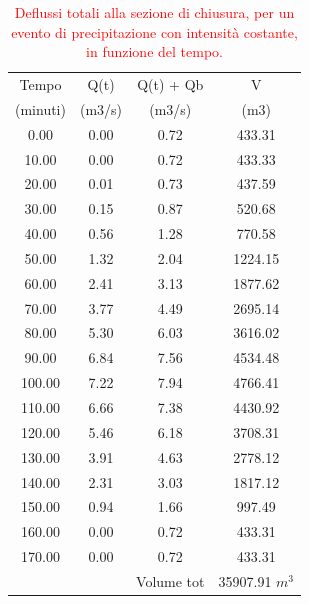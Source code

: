 \begin{table}[H] \centering
    \caption{\textcolor{red}{Deflussi totali alla sezione di chiusura, per un evento di precipitazione con intensità costante, in funzione del tempo.}}
    \begin{tabular}{cccc}
        \toprule
        Tempo    & Q(t)   & Q(t) + Qb           & V                 \\
        (minuti) & (m3/s) & (m3/s)              & (m3)              \\
        \midrule
        0.00     & 0.00   & 0.72                & 433.31            \\
        10.00    & 0.00   & 0.72                & 433.33            \\
        20.00    & 0.01   & 0.73                & 437.59            \\
        30.00    & 0.15   & 0.87                & 520.68            \\
        40.00    & 0.56   & 1.28                & 770.58            \\
        50.00    & 1.32   & 2.04                & 1224.15           \\
        60.00    & 2.41   & 3.13                & 1877.62           \\
        70.00    & 3.77   & 4.49                & 2695.14           \\
        80.00    & 5.30   & 6.03                & 3616.02           \\
        90.00    & 6.84   & 7.56                & 4534.48           \\
        100.00   & 7.22   & 7.94                & 4766.41           \\
        110.00   & 6.66   & 7.38                & 4430.92           \\
        120.00   & 5.46   & 6.18                & 3708.31           \\
        130.00   & 3.91   & 4.63                & 2778.12           \\
        140.00   & 2.31   & 3.03                & 1817.12           \\
        150.00   & 0.94   & 1.66                & 997.49            \\
        160.00   & 0.00   & 0.72                & 433.31            \\
        170.00   & 0.00   & 0.72                & 433.31            \\
        \bottomrule
                 &        & Volume tot & 35907.91 $m^3$
        \end{tabular}
        \end{table}

